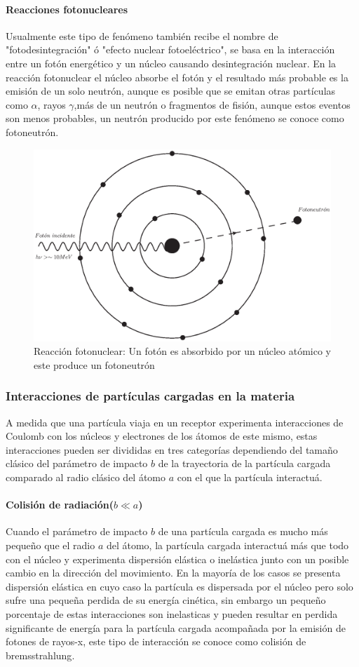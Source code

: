 \paragraph{Reacciones fotonucleares}
 Usualmente este tipo de fenómeno también recibe el nombre de "fotodesintegración" ó "efecto nuclear fotoeléctrico", se basa en la interacción entre un fotón energético y un núcleo causando desintegración nuclear. En la reacción fotonuclear el núcleo absorbe el fotón y el resultado más probable es la emisión de un solo neutrón, aunque es posible que se emitan otras partículas como $\alpha$, rayos $\gamma$,más de un neutrón o fragmentos de fisión, aunque estos eventos son menos probables, un neutrón producido por este fenómeno se conoce como fotoneutrón\cite{Podgorsak}.

 \begin{figure}[htbp]
     \centering
     \includegraphics[width=.68\linewidth]{./Figures/fotoneu.eps}
     \caption[Reacción fotonuclear]{Reacción fotonuclear: Un fotón es absorbido por un núcleo atómico y este produce un fotoneutrón}
     \label{fig:RF}
 \end{figure}


\subsubsection{Interacciones de partículas cargadas en la materia}
A medida que una partícula viaja en un receptor experimenta interacciones de Coulomb con los núcleos y electrones de los átomos de este mismo, estas interacciones pueden ser divididas en tres categorías dependiendo del tamaño clásico del parámetro de impacto $b$ de la trayectoria de la partícula cargada comparado al radio clásico del átomo $a$ con el que la partícula interactuá.
\paragraph{Colisión de radiación($b\ll a$)}
Cuando el parámetro de impacto $b$ de una partícula cargada es mucho más pequeño que el radio $a$ del átomo, la partícula cargada interactuá más que todo con el núcleo y experimenta dispersión elástica o inelástica junto con un posible cambio en la dirección del movimiento. En la mayoría de los casos se presenta dispersión elástica en cuyo caso la partícula es dispersada por el núcleo pero solo sufre una pequeña perdida de su energía cinética, sin embargo un pequeño porcentaje de estas interacciones son inelasticas y pueden resultar en perdida significante de energía para la partícula cargada acompañada por la emisión de fotones de rayos-x, este tipo de interacción se conoce como colisión de bremsstrahlung\cite{Podgorsak}.


